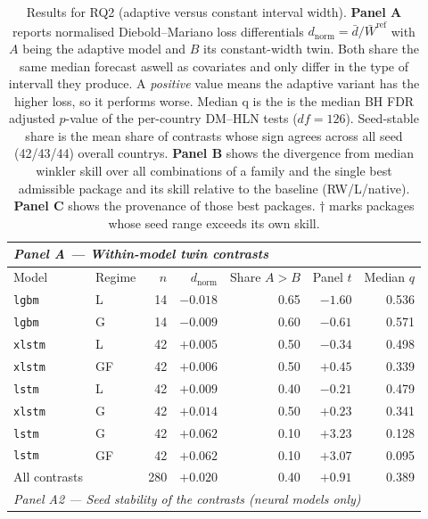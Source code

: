 \begin{table}[htbp]
  \centering\small
  \caption{Results for RQ2 (adaptive versus constant interval width).
  \textbf{Panel A} reports normalised Diebold--Mariano loss differentials
  $d_{\text{norm}}=\bar d/\bar W^{\text{ref}}$ with $A$ being the adaptive model
  and $B$ its constant-width twin. Both share the same median forecast aswell as covariates and only differ in the type of intervall they produce. A \emph{positive} value means the adaptive variant has
  the higher loss, so it performs worse. Median q is the is the median BH FDR adjusted $p$-value of the per-country DM--HLN tests ($df=126$). Seed-stable share is the mean share of contrasts whose sign agrees across all seed (42/43/44) overall countrys. 
  \textbf{Panel B} shows the divergence from 
  median winkler skill over all combinations of a family and the single best
  admissible package and its skill relative to the baseline (RW/L/native).
  \textbf{Panel C} shows the provenance of those best
  packages. $\dagger$ marks packages whose seed range exceeds its own
  skill.}
  \label{tab:rq2_results}
  \begin{tabular}{llrrrrr}
    \toprule
    \multicolumn{7}{l}{\emph{Panel A --- Within-model twin contrasts}} \\
    \midrule
    Model & Regime & $n$ & $d_{\text{norm}}$ & Share $A\!>\!B$ & Panel $t$ & Median $q$ \\
    \midrule
    \texttt{lgbm}  & L  & 14 & $-0.018$ & 0.65 & $-1.60$ & 0.536 \\
    \texttt{lgbm}  & G  & 14 & $-0.009$ & 0.60 & $-0.61$ & 0.571 \\
    \texttt{xlstm} & L  & 42 & $+0.005$ & 0.50 & $-0.34$ & 0.498 \\
    \texttt{xlstm} & GF & 42 & $+0.006$ & 0.50 & $+0.45$ & 0.339 \\
    \texttt{lstm}  & L  & 42 & $+0.009$ & 0.40 & $-0.21$ & 0.479 \\
    \texttt{xlstm} & G  & 42 & $+0.014$ & 0.50 & $+0.23$ & 0.341 \\
    \texttt{lstm}  & G  & 42 & $+0.062$ & 0.10 & $+3.23$ & 0.128 \\
    \texttt{lstm}  & GF & 42 & $+0.062$ & 0.10 & $+3.07$ & 0.095 \\
    \midrule
    All contrasts &   & 280 & $+0.020$ & 0.40 & $+0.91$ & 0.389 \\
    \midrule
    \multicolumn{7}{l}{\emph{Panel A2 --- Seed stability of the contrasts (neural models only)}} \\

\end{tabular}
\end{table}
